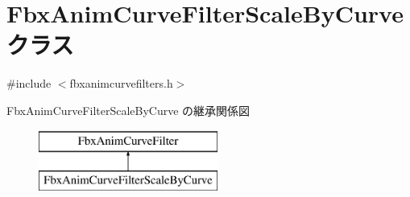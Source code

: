 \hypertarget{class_fbx_anim_curve_filter_scale_by_curve}{}\section{Fbx\+Anim\+Curve\+Filter\+Scale\+By\+Curve クラス}
\label{class_fbx_anim_curve_filter_scale_by_curve}


{\ttfamily \#include $<$fbxanimcurvefilters.\+h$>$}

Fbx\+Anim\+Curve\+Filter\+Scale\+By\+Curve の継承関係図\begin{figure}[H]
\begin{center}
\leavevmode
\includegraphics[height=2.000000cm]{class_fbx_anim_curve_filter_scale_by_curve}
\end{center}
\end{figure}
